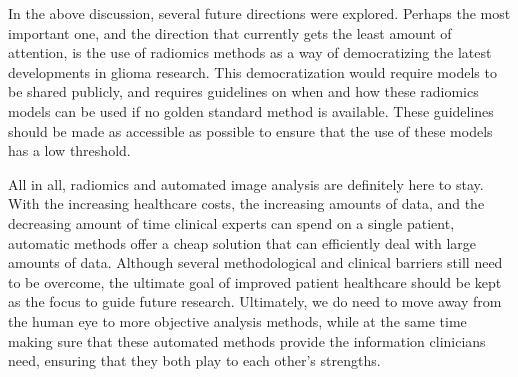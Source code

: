In the above discussion, several future directions were explored.
Perhaps the most important one, and the direction that currently gets the least amount of attention, is the use of radiomics methods as a way of democratizing the latest developments in glioma research.
This democratization would require models to be shared publicly, and requires guidelines on when and how these radiomics models can be used if no golden standard method is available.
These guidelines should be made as accessible as possible to ensure that the use of these models has a low threshold.

All in all, radiomics and automated image analysis are definitely here to stay.
With the increasing healthcare costs, the increasing amounts of data, and the decreasing amount of time clinical experts can spend on a single patient, automatic methods offer a cheap solution that can efficiently deal with large amounts of data.
Although several methodological and clinical barriers still need to be overcome, the ultimate goal of improved patient healthcare should be kept as the focus to guide future research.
Ultimately, we do need to move away from the human eye to more objective analysis methods, while at the same time making sure that these automated methods provide the information clinicians need, ensuring that they both play to each other's strengths.

